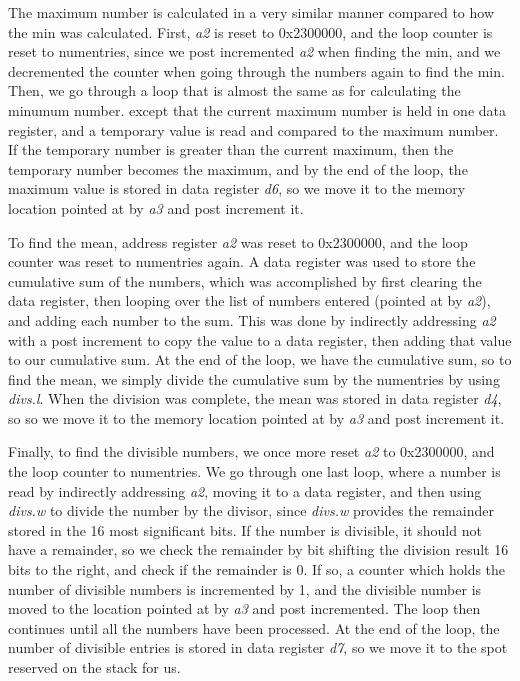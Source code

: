 \documentclass[letterpaper]{article}
\begin{document}
    The maximum number is calculated in a very similar manner compared to how
    the min was calculated. First, \textit{a2} is reset to 0x2300000, and the loop counter
    is reset to numentries, since we post
    incremented \textit{a2} when finding the min, and we decremented the counter
    when going through the numbers again to find the min.
    Then, we go through a loop that is almost the same as for calculating the minumum number.
    except that the current maximum number is held in one data register,
    and a temporary value is read and compared to the maximum number. If the temporary
    number is greater than the current maximum, then the temporary number becomes the
    maximum, and by the end of the loop, the maximum value is stored in data register \textit{d6},
    so we move it to
    the memory location pointed at by \textit{a3} and post increment it.

    To find the mean, address register \textit{a2} was reset to 0x2300000,
    and the loop counter was reset to numentries again. A data register was used
    to store the cumulative sum of the numbers, which was accomplished by
    first clearing the data register, then looping over the list of
    numbers entered (pointed at by \textit{a2}), and adding each number
    to the sum. This was done by indirectly addressing \textit{a2} with
    a post increment to copy the value to a data register, then adding
    that value to our cumulative sum. At the end of the loop, we have the
    cumulative sum, so to
    find the mean, we simply divide the cumulative sum by the numentries
    by using \textit{divs.l}. When the division was complete, the
    mean was stored in data register \textit{d4}, so so we move it to
    the memory location pointed at by \textit{a3} and post increment it.

    Finally, to find the divisible numbers, we once more reset \textit{a2}
    to 0x2300000, and the loop counter to numentries. We go through one last loop,
    where a number is read by indirectly addressing \textit{a2}, moving it to
    a data register, and then using \textit{divs.w} to divide the number by the
    divisor, since \textit{divs.w} provides the remainder stored in the
    16 most significant bits. If the number is divisible, it
    should not have a remainder, so we check the remainder by
    bit shifting the division result 16 bits to the right, and check if
    the remainder is 0. If so, a counter which holds the number of
    divisible numbers is incremented by 1, and the divisible number
    is moved to the location pointed at by \textit{a3} and post incremented.
    The loop then continues until all the numbers have been processed. At the
    end of the loop, the number of divisible entries is stored in data register \textit{d7},
    so we move it to the spot reserved on the stack for us.
\end{document}
